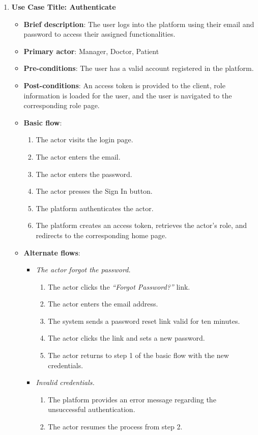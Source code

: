 \begin{enumerate}
\vspace{0.5em}

\item \textbf{Use Case Title: Authenticate}
\begin{itemize}
    \item \textbf{Brief description}: The user logs into the platform using their email and password to access their assigned functionalities.
    \item \textbf{Primary actor}: Manager, Doctor, Patient
    \item \textbf{Pre-conditions}: The user has a valid account registered in the platform.
    \item \textbf{Post-conditions}: An access token is provided to the client, role information is loaded for the user, and the user is navigated to the corresponding role page.
    \item \textbf{Basic flow}:
    \begin{enumerate}
        \item The actor visits the login page.
        \item The actor enters the email.
        \item The actor enters the password.
        \item The actor presses the Sign In button.
        \item The platform authenticates the actor.
        \item The platform creates an access token, retrieves the actor's role, and redirects to the corresponding home page.
    \end{enumerate}
    \item \textbf{Alternate flows}:
    \begin{itemize}
        \item[4a.] \textit{The actor forgot the password.}
        \begin{enumerate}
            \item The actor clicks the \textit{``Forgot Password?''} link.
            \item The actor enters the email address.
            \item The system sends a password reset link valid for ten minutes.
            \item The actor clicks the link and sets a new password.
            \item The actor returns to step 1 of the basic flow with the new credentials.
        \end{enumerate}
        \item[5a.] \textit{Invalid credentials.}
        \begin{enumerate}
            \item The platform provides an error message regarding the unsuccessful authentication.
            \item The actor resumes the process from step 2.
        \end{enumerate}
    \end{itemize}
\end{itemize}


\end{enumerate}
